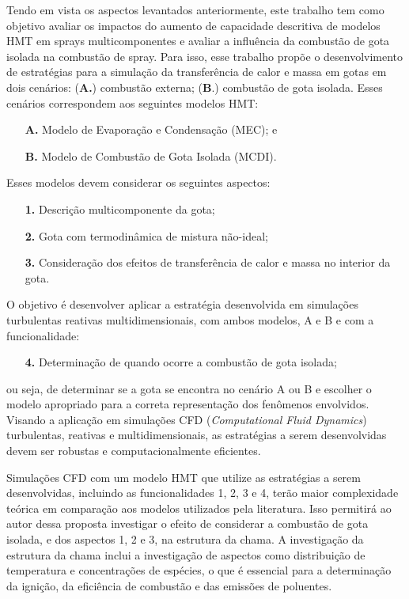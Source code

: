 Tendo em vista os aspectos levantados anteriormente, este trabalho tem como objetivo avaliar os impactos do aumento de capacidade descritiva de modelos HMT em sprays multicomponentes e avaliar a influência da combustão de gota isolada na combustão de spray.
Para isso, esse trabalho propõe o desenvolvimento de estratégias para a simulação da transferência de calor e massa em gotas em dois cenários: (\textbf{A.}) combustão externa; (\textbf{B}.) combustão de gota isolada.
Esses cenários correspondem aos seguintes modelos HMT:
\begin{enumerate}
    \item[\textbf{A.}] Modelo de Evaporação e Condensação (MEC); e 
    \item[\textbf{B.}] Modelo de Combustão de Gota Isolada (MCDI).
\end{enumerate}
Esses modelos devem considerar os seguintes aspectos: 
\begin{enumerate}
    \item[\textbf{1.}] Descrição multicomponente da gota; 
    \item[\textbf{2.}] Gota com termodinâmica de mistura não-ideal; 
    \item[\textbf{3.}] Consideração dos efeitos de transferência	de calor e massa no interior da gota. 
\end{enumerate}
O objetivo é desenvolver aplicar a estratégia desenvolvida em simulações turbulentas reativas multidimensionais, com ambos modelos, {A} e {B} e com a funcionalidade:
\begin{enumerate}
    \item[\textbf{4.}] Determinação de quando ocorre a combustão de gota isolada;
\end{enumerate}
ou seja, de determinar se a gota se encontra no cenário {A} ou {B} e escolher o modelo apropriado para a correta representação dos fenômenos envolvidos.
Visando a aplicação em simulações CFD (\emph{Computational Fluid Dynamics}) turbulentas, reativas e multidimensionais, as estratégias a serem desenvolvidas devem ser robustas e computacionalmente eficientes.

Simulações CFD com um modelo HMT que utilize as estratégias a serem desenvolvidas, incluindo as funcionalidades {1}, {2}, {3} e {4}, terão maior complexidade teórica em comparação aos modelos utilizados pela literatura. 
Isso permitirá ao autor dessa proposta investigar o efeito de considerar a combustão de gota isolada, e dos aspectos {1}, {2} e {3}, na estrutura da chama.
A investigação da estrutura da chama inclui a investigação de aspectos como distribuição de temperatura e concentrações de espécies, o que é essencial para a determinação da ignição, da eficiência de combustão e das emissões de poluentes.
